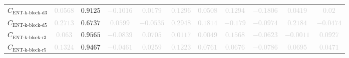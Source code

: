 \documentclass{standalone}
\newcommand{\entkblockdthreename}{\text{ENT-k-block-d3}}
\newcommand{\entkblockdthree}{C_{\entkblockdthreename}}
\newcommand{\entkblockdfivename}{\text{ENT-k-block-d5}}
\newcommand{\entkblockdfive}{C_{\entkblockdfivename}}
\newcommand{\entkblockrthreename}{\text{ENT-k-block-r3}}
\newcommand{\entkblockrthree}{C_{\entkblockrthreename}}
\newcommand{\entkblockrfivename}{\text{ENT-k-block-r5}}
\newcommand{\entkblockrfive}{C_{\entkblockrfivename}}
\begin{document}
\begin{tabular}{lcccccccccc}
$\entkblockdthree$ & \textcolor{lightgray}{$0.0568$} & $0.9125$ & \textcolor{lightgray}{$-0.1016$} & \textcolor{lightgray}{$0.0179$} & \textcolor{lightgray}{$0.1296$} & \textcolor{lightgray}{$0.0508$} & \textcolor{lightgray}{$0.1294$} & \textcolor{lightgray}{$-0.1806$} & \textcolor{lightgray}{$0.0419$} & \textcolor{lightgray}{$0.02$} \\ 
$\entkblockdfive$ & \textcolor{lightgray}{$0.2713$} & $0.6737$ & \textcolor{lightgray}{$0.0599$} & \textcolor{lightgray}{$-0.0535$} & \textcolor{lightgray}{$0.2948$} & \textcolor{lightgray}{$0.1814$} & \textcolor{lightgray}{$-0.179$} & \textcolor{lightgray}{$-0.0974$} & \textcolor{lightgray}{$0.2184$} & \textcolor{lightgray}{$-0.0474$} \\ 
$\entkblockrthree$ & \textcolor{lightgray}{$0.063$} & $0.9565$ & \textcolor{lightgray}{$-0.0839$} & \textcolor{lightgray}{$0.0705$} & \textcolor{lightgray}{$0.0117$} & \textcolor{lightgray}{$0.0049$} & \textcolor{lightgray}{$0.1568$} & \textcolor{lightgray}{$-0.0623$} & \textcolor{lightgray}{$-0.0011$} & \textcolor{lightgray}{$0.0927$} \\ 
$\entkblockrfive$ & \textcolor{lightgray}{$0.1324$} & $0.9467$ & \textcolor{lightgray}{$-0.0461$} & \textcolor{lightgray}{$0.0259$} & \textcolor{lightgray}{$0.1223$} & \textcolor{lightgray}{$0.0761$} & \textcolor{lightgray}{$0.0676$} & \textcolor{lightgray}{$-0.0786$} & \textcolor{lightgray}{$0.0695$} & \textcolor{lightgray}{$0.0471$} \\ 
\bottomrule
\end{tabular}
\end{document}
